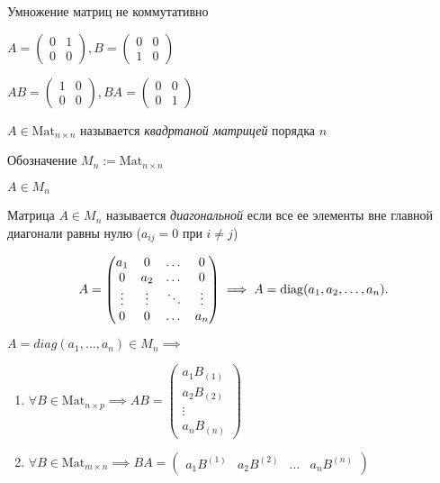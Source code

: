 Умножение матриц не коммутативно

$A = \begin{pmatrix} 0 & 1 \\ 0 & 0 \end{pmatrix}, 
B = \begin{pmatrix} 0 & 0 \\ 1 & 0 \end{pmatrix}$

$AB = \begin{pmatrix}1 & 0 \\ 0 & 0\end{pmatrix}, 
BA = \begin{pmatrix}0 & 0 \\ 0 & 1\end{pmatrix}$

\bigskip
\begin{definition}
    $A \in \text{Mat}_{n \times n}$ называется \textit{квадртаной матрицей} порядка $n$
\end{definition}

Обозначение $M_n := \text{Mat}_{n \times n}$

$A \in M_n$

\bigskip
\begin{definition}
    Матрица $A \in M_n$ называется \textit{диагональной} если все ее элементы вне главной диагонали равны нулю ($a_{ij} = 0$ при $i \neq j$)
\end{definition}

\begin{equation*}
    A = \begin{pmatrix} 
        a_1 & 0 & \dots & 0 \\
        0 & a_2 & \dots & 0 \\
        \vdots & \vdots & \ddots & \vdots \\
        0 & 0 & \dots & a_n
    \end{pmatrix} \implies A = \operatorname{\mathop{\mathrm{diag}}}(a_1, a_2, \dots, a_n)
.\end{equation*}

\begin{lemma}
    $A = diag(a_1, \dots, a_n) \in M_n \implies$
    \begin{enumerate}
    \item $\forall B \in \text{Mat}_{n \times p} \implies AB = \begin{pmatrix}
            a_1 B_{(1)} \\
            a_2 B_{(2)} \\
            \vdots \\
            a_n B_{(n)} 
        \end{pmatrix}$
    \item $\forall B \in \text{Mat}_{m \times n} \implies BA = \begin{pmatrix} 
            a_1 B^{(1)} & a_2 B^{(2)} & \dots & a_n B^{(n)}
        \end{pmatrix}$ 
    \end{enumerate}
\end{lemma}


